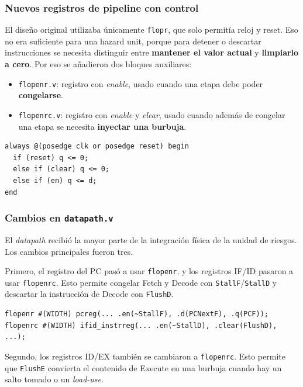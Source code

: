 \documentclass[11pt,a4paper]{article}
\begin{document}
\subsubsection{Nuevos registros de pipeline con control}

El diseño original utilizaba únicamente \texttt{flopr}, que solo permitía reloj y reset.
Eso no era suficiente para una hazard unit, porque para detener o descartar instrucciones
se necesita distinguir entre \textbf{mantener el valor actual} y \textbf{limpiarlo a
	cero}. Por eso se añadieron dos bloques auxiliares:

\begin{itemize}
	\item \texttt{flopenr.v}: registro con \textit{enable}, usado cuando una etapa debe
	      poder \textbf{congelarse}.
	\item \texttt{flopenrc.v}: registro con \textit{enable} y \textit{clear}, usado cuando
	      además de congelar una etapa se necesita \textbf{inyectar una burbuja}.
\end{itemize}

\begin{lstlisting}
always @(posedge clk or posedge reset) begin
  if (reset) q <= 0;
  else if (clear) q <= 0;
  else if (en) q <= d;
end
\end{lstlisting}

\subsubsection{Cambios en \texttt{datapath.v}}

El \textit{datapath} recibió la mayor parte de la integración física de la unidad de
riesgos. Los cambios principales fueron tres.

Primero, el registro del PC pasó a usar \texttt{flopenr}, y los registros IF/ID pasaron
a usar \texttt{flopenrc}. Esto permite congelar Fetch y Decode con
\texttt{StallF}/\texttt{StallD} y descartar la instrucción de Decode con
\texttt{FlushD}.

\begin{lstlisting}
flopenr #(WIDTH) pcreg(... .en(~StallF), .d(PCNextF), .q(PCF));
flopenrc #(WIDTH) ifid_instrreg(... .en(~StallD), .clear(FlushD), ...);
\end{lstlisting}

Segundo, los registros ID/EX también se cambiaron a \texttt{flopenrc}. Esto permite que
\texttt{FlushE} convierta el contenido de Execute en una burbuja cuando hay un salto
tomado o un \textit{load-use}.
\end{document}
